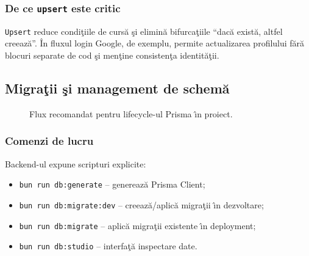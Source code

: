 \documentclass[12pt,onecolumn,draftclsnofoot]{IEEEtran}
\begin{document}
\subsubsection{De ce \texttt{upsert} este critic}
\texttt{Upsert} reduce condi\c{t}iile de curs\u{a} \c{s}i elimin\u{a} bifurca\c{t}iile \enquote{dac\u{a} exist\u{a}, altfel creeaz\u{a}}. \^{I}n fluxul login Google, de exemplu, permite actualizarea profilului f\u{a}r\u{a} blocuri separate de cod \c{s}i men\c{t}ine consisten\c{t}a identit\u{a}\c{t}ii.

\newpage
\subsection{Migra\c{t}ii \c{s}i management de schem\u{a}}

\begin{figure}[htbp]
  \centering
  \caption{Flux recomandat pentru lifecycle-ul Prisma \^{\i}n proiect.}
  \label{fig:prisma-pipeline}
\end{figure}
\FloatBarrier

\subsubsection{Comenzi de lucru}
Backend-ul expune scripturi explicite:
\begin{itemize}
  \item \texttt{bun run db:generate} -- genereaz\u{a} Prisma Client;
  \item \texttt{bun run db:migrate:dev} -- creeaz\u{a}/aplic\u{a} migra\c{t}ii \^{\i}n dezvoltare;
  \item \texttt{bun run db:migrate} -- aplic\u{a} migra\c{t}ii existente \^{\i}n deployment;
  \item \texttt{bun run db:studio} -- interfa\c{t}\u{a} inspectare date.
\end{itemize}
\end{document}

